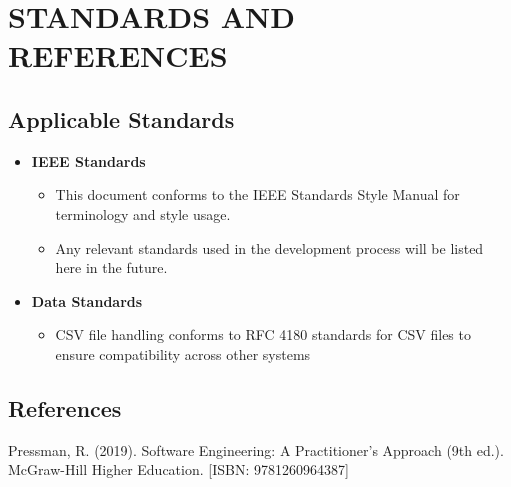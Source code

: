 \documentclass[letterpaper,12pt,oneside,listof=totoc]{scrreprt}
\begin{document}
\chapter{STANDARDS AND REFERENCES}

\section{Applicable Standards}
\begin{itemize}
    \item\textbf{IEEE Standards}
    \begin{itemize}
    	\item This document conforms to the IEEE Standards Style Manual for terminology and style usage.  
    	\item Any relevant standards used in the development process will be listed here in the future.
    \end{itemize}
    \item\textbf{Data Standards}
    \begin{itemize}
    \item CSV file handling conforms to RFC 4180 standards for CSV files to ensure compatibility across other systems
    \end{itemize}        
\end{itemize}
\section{References}
Pressman, R. (2019). Software Engineering: A Practitioner's Approach (9th ed.). McGraw-Hill Higher Education. [ISBN: 9781260964387]
\end{document}
